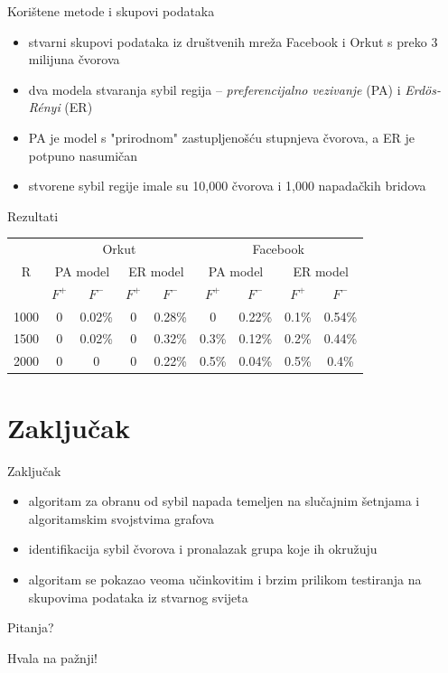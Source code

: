 \documentclass{beamer}
\begin{document}
\begin{frame}{Korištene metode i skupovi podataka}
  \begin{itemize}
    \item stvarni skupovi podataka iz društvenih mreža Facebook i Orkut s preko 3 milijuna čvorova
    \item dva modela stvaranja sybil regija -- \textit{preferencijalno vezivanje} (PA) i \textit{Erdös-Rényi} (ER)
    \item PA je model s "prirodnom" zastupljenošću stupnjeva čvorova, a ER je potpuno nasumičan
    \item stvorene sybil regije imale su 10,000 čvorova i 1,000 napadačkih bridova
  \end{itemize}
\end{frame}

\begin{frame}{Rezultati}
  \begin{table}
    \centering
    \begin{tabular}{|c|c|c|c|c|c|c|c|c|} \hline
      \multirow{3}{*}{R} & \multicolumn{4}{c|}{Orkut} & \multicolumn{4}{c|}{Facebook} \\
      & \multicolumn{2}{c}{PA model} & \multicolumn{2}{c|}{ER model} & \multicolumn{2}{c}{PA model} & \multicolumn{2}{c|}{ER model} \\
      & \multicolumn{1}{c}{$F^+$} & \multicolumn{1}{c}{$F^-$} & \multicolumn{1}{c}{$F^+$} & \multicolumn{1}{c|}{$F^-$} & \multicolumn{1}{c}{$F^+$} & \multicolumn{1}{c}{$F^-$} & \multicolumn{1}{c}{$F^+$} & \multicolumn{1}{c|}{$F^-$} \\ \hline
      1000 & 0 & 0.02\% & 0 & 0.28\% & 0 & 0.22\% & 0.1\% & 0.54\% \\
      1500 & 0 & 0.02\% & 0 & 0.32\% & 0.3\% & 0.12\% & 0.2\% & 0.44\% \\
      2000 & 0 & 0 & 0 & 0.22\% & 0.5\% & 0.04\% & 0.5\% & 0.4\% \\
      \hline
    \end{tabular}
  \end{table}
\end{frame}

\section{Zaključak}

\begin{frame}{Zaključak}
  \begin{itemize}
    \item algoritam za obranu od sybil napada temeljen na slučajnim šetnjama i algoritamskim svojstvima grafova
    \item identifikacija sybil čvorova i pronalazak grupa koje ih okružuju
    \item algoritam se pokazao veoma učinkovitim i brzim prilikom testiranja na skupovima podataka iz stvarnog svijeta
  \end{itemize}
\end{frame}

\begin{frame}[standout]
  \Huge{\centerline{Pitanja?}}
\end{frame}

\begin{frame}[standout]
  \Huge{\centerline{Hvala na pažnji!}}
\end{frame}
\end{document}
